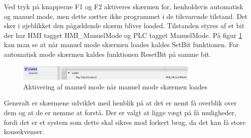Ved tryk på knapperne F1 og F2 aktiveres skærmen for, henholdsvis automatisk og manuel mode, men dette sætter ikke programmet i de tilsvarende tilstand. Det sker i øjeblikket den pågældende skærm bliver loaded. Tilstanden styres af et bit der har HMI tagget HMI\_ManuelMode og PLC tagget ManuelMode. På figur \ref{fig:LoadManuelModeSkaerm} kan man se at når manuel mode skærmen loades kaldes SetBit funktionen. For automatisk mode skærmen kaldes funktionen ResetBit på samme bit.

\begin{figure}[H] %
	\centering
	\includegraphics[width=0.8\textwidth]{Figure/LoadManuelModeSkaerm}
	\caption{Aktivering af manuel mode når manuel mode skærmen loades}
	\label{fig:LoadManuelModeSkaerm}
\end{figure}

Generalt er skærmene udviklet med henblik på at det er nemt få overblik over dem og at de er nemme at forstå. Der er valgt at ligge vægt på få muligheder, fordi det er et system som dette skal sikres mod forkert brug, da det kan få store konsekvenser.